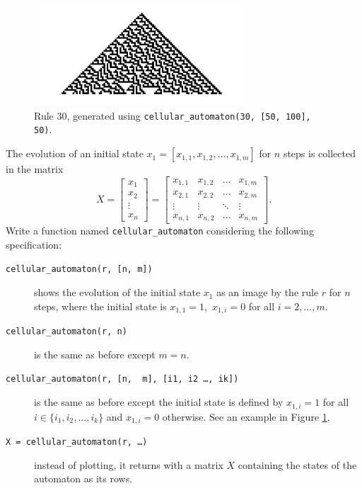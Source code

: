 \documentclass[a4paper, fleqn, 10pt]{report}
\theoremstyle{definition}
\newcommand{\mc}[1]{{\color{Blue}\tt #1}}
\newcommand{\mck}[1]{{\tt#1}}
\begin{document}
\begin{figure}[ht!]
\centering
  \includegraphics[width=0.7\textwidth]{rule30}
  \caption{Rule 30, generated using \mc{cellular\_automaton}\mck{(30,\,[50,\,100],\,50)}.}\label{fig:automaton}
\end{figure}

The evolution of an initial state $x_1=[x_{1,1},x_{1,2},\dots,x_{1,m}]$ for $n$ steps is collected in the matrix
\[X = \begin{bmatrix}
       x_1\\
       x_2\\
       \vdots\\
       x_n
      \end{bmatrix} = 
     \begin{bmatrix}
       x_{1,1} & x_{1,2} & \dots & x_{1,m}\\
       x_{2,1} & x_{2,2} & \dots & x_{2,m}\\
       \vdots & \vdots & \ddots & \vdots\\
       x_{n,1} & x_{n,2} & \dots & x_{n,m}
      \end{bmatrix}.
      \]
Write a function named \mc{cellular\_automaton} considering the following specification:
\begin{description}
  \item[\mc{cellular\_automaton}\mck{(r, [n,\,m])}] shows the evolution of the initial state $x_1$  as an image by the rule $r$ for $n$ steps, where the initial state is $x_{1,1}=1,$ $x_{1,i}=0$ for all $i=2,\dots,m.$
  \item[\mc{cellular\_automaton}\mck{(r, n)}] is the same as before except $m=n.$
  \item[\mc{cellular\_automaton}\mck{(r, [n,\, m], [i1,\,i2\,\dots,\,ik])}] is the same as before except the initial state is defined by $x_{1,i}=1$ for all $i\in\{i_1,i_2,\dots,i_k\}$ and $x_{1,i}=0$ otherwise. See an example in Figure \ref{fig:automaton}.
  \item[\mck{X = }\mc{cellular\_automaton}\mck{(r, \dots)}] instead of plotting, it returns with a matrix $X$ containing the states of the automaton as its rows.
\end{description}
\end{document}
